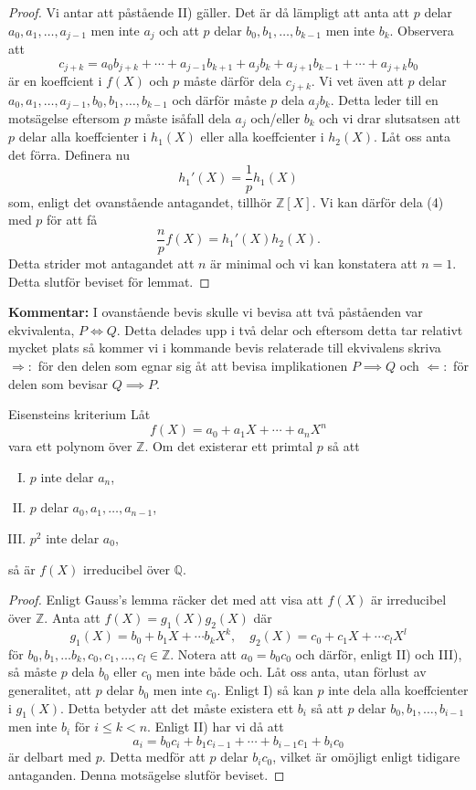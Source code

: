 \documentclass{article}
\theoremstyle{definition}
\begin{document}
\begin{proof}
  Vi antar att påstående II) gäller. Det är då lämpligt att anta att $p$ delar $a_0, a_{1}, \ldots, a_{j-1}$ men inte $a_j$ och att 
  $p$ delar $b_0, b_{1}, \ldots, b_{k-1}$ men inte $b_k$. Observera att
  \[c_{j+k} = a_0b_{j+k} + \cdots + a_{j-1}b_{k+1} + a_jb_k + a_{j+1}b_{k-1} + \cdots + a_{j+k}b_0\]
  är en koeffcient i $f(X)$ och $p$ måste därför dela $c_{j+k}$. Vi vet även att $p$ delar $a_0, a_{1}, \ldots, a_{j-1}, b_0, b_{1}, \ldots, b_{k-1}$ 
  och därför måste $p$ dela $a_j b_k$. Detta leder till en motsägelse eftersom $p$ måste isåfall dela $a_j$ och/eller $b_k$ och vi drar slutsatsen att 
  $p$ delar alla koeffcienter i $h_1(X)$ eller alla koeffcienter i $h_2(X)$. Låt oss anta det förra. Definera nu 
  \[h_1'(X) = \frac{1}{p} h_1(X)\]
  som, enligt det ovanstående antagandet, tillhör $\mathbb{Z}[X].$ Vi kan därför dela (4) med $p$ för att få
  \[\frac{n}{p} f(X) = h_1'(X) h_2(X).\]
  Detta strider mot antagandet att $n$ är minimal och vi kan konstatera att $n=1$. Detta slutför beviset för lemmat.
\end{proof}
\textbf{Kommentar: }I ovanstående bevis skulle vi bevisa att två påståenden var ekvivalenta, $P \iff Q$. 
Detta delades upp i två delar och eftersom detta tar relativt mycket plats så kommer vi i kommande bevis relaterade till ekvivalens skriva 
$\Rightarrow:$ för den delen som egnar sig åt att bevisa implikationen $P \implies Q$ och $\Leftarrow:$ 
för delen som bevisar $Q \implies P$.

\begin{mytheo}{Eisensteins kriterium}{}
  Låt
  \[f(X) = a_0 + a_1X + \cdots + a_nX^n\]
  vara ett polynom över $\mathbb{Z}$. Om det existerar ett primtal $p$ så att 
  \begin{enumerate}[I)]
    \item $p$ inte delar $a_n$,
    \item $p$ delar $a_0, a_1, \ldots, a_{n-1}$,
    \item $p^2$ inte delar $a_0$,
  \end{enumerate}
  så är $f(X)$ irreducibel över $\mathbb{Q}$.
\end{mytheo}
\begin{proof}
  Enligt Gauss's lemma räcker det med att visa att $f(X)$ är irreducibel över $\mathbb{Z}$. Anta att $f(X) = g_1(X) g_2(X)$ där 
  \[g_1(X) = b_0 + b_1X + \cdots b_kX^k, \quad g_2(X) = c_0 + c_1X + \cdots c_lX^l\]
  för $b_0, b_1, \ldots b_k, c_0, c_1, \ldots, c_l \in \mathbb{Z}.$
  Notera att $a_0 = b_0 c_0$ och därför, enligt II) och III), så måste $p$ dela $b_0$ eller $c_0$ men inte både och. Låt oss anta, utan förlust av 
  generalitet, att $p$ delar $b_0$ men inte $c_0$. Enligt I) så kan $p$ inte dela alla koeffcienter i $g_1(X)$. Detta betyder att det måste existera ett $b_i$ så att $p$ delar
  $b_0, b_1, \ldots, b_{i-1}$ men inte $b_i$ för $i \leq k < n$. Enligt II) har vi då att 
  \[a_i = b_0c_i + b_1c_{i-1} + \cdots + b_{i-1}c_1 + b_ic_0\]
  är delbart med $p$. Detta medför att $p$ delar $b_i c_0$, vilket är omöjligt enligt tidigare antaganden.
  Denna motsägelse slutför beviset.
\end{proof}
\end{document}
